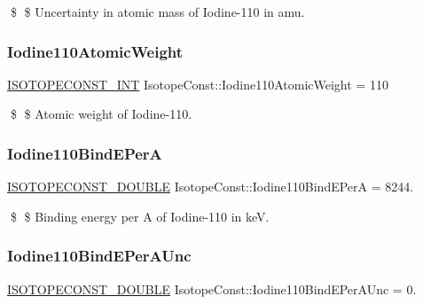 \$ \$ Uncertainty in atomic mass of Iodine-\/110 in amu. \mbox{\label{group___isotope_const-_iodine-_i110_ga618566544f0bcbac08960f7e257a66ca}} 
\subsubsection{\texorpdfstring{Iodine110\+Atomic\+Weight}{Iodine110AtomicWeight}}
{\footnotesize\ttfamily \mbox{\hyperlink{group___isotope_const-_macros_ga5f18360b3e99483a35c32d789e62621c}{I\+S\+O\+T\+O\+P\+E\+C\+O\+N\+S\+T\+\_\+\+I\+NT}} Isotope\+Const\+::\+Iodine110\+Atomic\+Weight = 110}

\$ \$ Atomic weight of Iodine-\/110. \mbox{\label{group___isotope_const-_iodine-_i110_gae2e89f953bd722b5941d5ba813f38caf}} 
\subsubsection{\texorpdfstring{Iodine110\+Bind\+E\+PerA}{Iodine110BindEPerA}}
{\footnotesize\ttfamily \mbox{\hyperlink{group___isotope_const-_macros_ga8f45a7272ce02c0b4c65c44636ed719a}{I\+S\+O\+T\+O\+P\+E\+C\+O\+N\+S\+T\+\_\+\+D\+O\+U\+B\+LE}} Isotope\+Const\+::\+Iodine110\+Bind\+E\+PerA = 8244.}

\$ \$ Binding energy per A of Iodine-\/110 in keV. \mbox{\label{group___isotope_const-_iodine-_i110_ga8c15767d6d23b6ce088c4179870392e2}} 
\subsubsection{\texorpdfstring{Iodine110\+Bind\+E\+Per\+A\+Unc}{Iodine110BindEPerAUnc}}
{\footnotesize\ttfamily \mbox{\hyperlink{group___isotope_const-_macros_ga8f45a7272ce02c0b4c65c44636ed719a}{I\+S\+O\+T\+O\+P\+E\+C\+O\+N\+S\+T\+\_\+\+D\+O\+U\+B\+LE}} Isotope\+Const\+::\+Iodine110\+Bind\+E\+Per\+A\+Unc = 0.}

